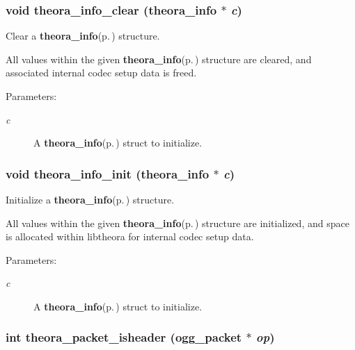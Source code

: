 \subsubsection{\setlength{\rightskip}{0pt plus 5cm}void theora\_\-info\_\-clear ({\bf theora\_\-info} $\ast$ {\em c})}\label{theora_8h_c72b3f8c404d658d1e675e39a75b1931}


Clear a {\bf theora\_\-info}{\rm (p.\,\pageref{structtheora__info})} structure. 

All values within the given {\bf theora\_\-info}{\rm (p.\,\pageref{structtheora__info})} structure are cleared, and associated internal codec setup data is freed. \begin{Desc}
\item[Parameters:]
\begin{description}
\item[{\em c}]A {\bf theora\_\-info}{\rm (p.\,\pageref{structtheora__info})} struct to initialize. \end{description}
\end{Desc}
\subsubsection{\setlength{\rightskip}{0pt plus 5cm}void theora\_\-info\_\-init ({\bf theora\_\-info} $\ast$ {\em c})}\label{theora_8h_f0f9fbb7e7bcce3c536e0b46d300c71e}


Initialize a {\bf theora\_\-info}{\rm (p.\,\pageref{structtheora__info})} structure. 

All values within the given {\bf theora\_\-info}{\rm (p.\,\pageref{structtheora__info})} structure are initialized, and space is allocated within libtheora for internal codec setup data. \begin{Desc}
\item[Parameters:]
\begin{description}
\item[{\em c}]A {\bf theora\_\-info}{\rm (p.\,\pageref{structtheora__info})} struct to initialize. \end{description}
\end{Desc}
\subsubsection{\setlength{\rightskip}{0pt plus 5cm}int theora\_\-packet\_\-isheader (ogg\_\-packet $\ast$ {\em op})}\label{theora_8h_b75731ff4e6a113430715dee160c1626}


